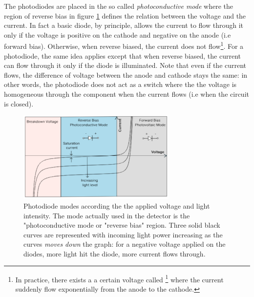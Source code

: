 \documentclass[11pt]{report}
\begin{document}
The photodiodes are placed in the so called \textit{photoconductive mode} where the region of reverse bias in figure \ref{fig:photodiode-vi} defines the relation between the voltage and the current. In fact a basic diode, by principle, allows the current to flow through it only if the voltage is positive on the cathode and negative on the anode (i.e forward bias). Otherwise, when reverse biased, the current does not flow\footnote{In practice, there exists a a certain voltage called \footnote{breakdown voltage} where the current suddenly flow exponentially from the anode to the cathode.}. For a photodiode, the same idea applies except that when reverse biased, the current can flow through it only if the diode is illuminated. Note that even if the current flows, the difference of voltage between the anode and cathode stays the same: in other words, the photodiode does not act as a switch where the the voltage is homogeneous through the component when the current flows (i.e when the circuit is closed). 

\begin{figure}[h!]
\centering
\includegraphics[width=0.7\textwidth]{photodiode-vi}
\caption{Photodiode modes according the the applied voltage and light intensity. The mode actually used in the detector is the "photoconductive mode or "reverse bias" region. Three solid black curves are represented with incoming light power increasing as the curves \textit{moves down} the graph: for a negative voltage applied on the diodes, more light hit the diode, more current flows through.}
\label{fig:photodiode-vi}
\end{figure}
\end{document}
